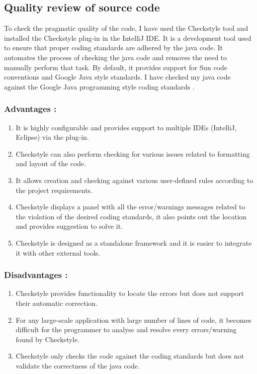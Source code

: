 \documentclass[12pt, a4paper]{article}
\begin{document}
\newpage
\subsection{Quality review of source code}
To check the pragmatic quality of the code, I have used the Checkstyle tool and installed the Checkstyle plug-in in the IntelliJ IDE. It is a development tool used to ensure that proper coding standards are adhered by the java code. It automates the process of checking the java code and removes the need to manually perform that task. By default, it provides support for Sun code conventions and Google Java style standards. I have checked my java code against the Google Java programming style coding standards \cite{Checkstyle} .

\subsubsection{Advantages : }
\begin{enumerate}
	\item It is highly configurable and provides support to multiple IDEs (IntelliJ, Eclipse) via the plug-in.
	\item Checkstyle can also perform checking for various issues related to formatting and layout of the code.
	\item It allows creation and checking against various user-defined rules according to the project requirements.
	\item Checkstyle displays a panel with all the error/warnings messages related to the violation of the desired coding standards, it also points out the location and provides suggestion to solve it.
	\item Checkstyle is designed as a standalone framework and it is easier to integrate it with other external tools.
\end{enumerate}

\subsubsection{Disadvantages : }
\begin{enumerate}
	\item Checkstyle provides functionality to locate the errors but does not support their automatic correction.
	\item For any large-scale application with large number of lines of code, it becomes difficult for the programmer to analyse and resolve every errors/warning found by Checkstyle.
	\item Checkstyle only checks the code against the coding standards but does not validate the correctness of the java code.
\end{enumerate}
\end{document}
